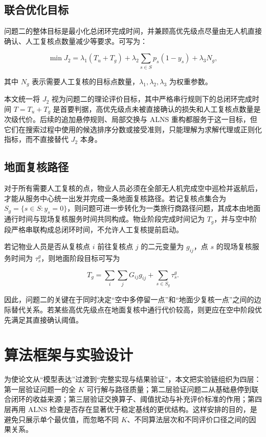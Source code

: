 \documentclass[12pt]{article}
\begin{document}
\subsection{联合优化目标}
问题二的整体目标是最小化总闭环完成时间，并兼顾高优先级点尽量由无人机直接确认、人工复核点数量减少等要求。可写为：

\begin{equation}
\min J_2 = \lambda_1 (T_u + T_g) + \lambda_2 \sum_{s \in S} p_s (1-y_s) + \lambda_3 N_g,
\end{equation}

其中 $N_g$ 表示需要人工复核的目标点数量，$\lambda_1,\lambda_2,\lambda_3$ 为权重参数。

本文统一将 $J_2$ 视为问题二的理论评价目标，其中严格串行规则下的总闭环完成时间 $T=T_u+T_g$ 是首要判据，高优先级点未被直接确认的损失和人工复核点数量是次级代价。后续的追加悬停规则、局部交换与 ALNS 重构都服务于这一目标，但它们在搜索过程中使用的候选排序分数或接受准则，只能理解为求解代理或正则化指标，而不直接替代 $J_2$ 本身。

\subsection{地面复核路径}
对于所有需要人工复核的点，物业人员必须在全部无人机完成空中巡检并返航后，才能从服务中心统一出发并完成一条地面复核路径。若记复核点集合为 $S_g=\{s \in S : y_s=0\}$，则问题可进一步转化为一类旅行商路径问题，其成本由地面通行时间与现场复核服务时间共同构成。物业阶段完成时间记为 $T_g$，并与空中阶段严格串联构成总闭环时间，不允许人工复核提前启动。

若记物业人员是否从复核点 $i$ 前往复核点 $j$ 的二元变量为 $g_{ij}$，点 $s$ 的现场复核服务时间为 $\tau_s^g$，则地面阶段目标可写为

\begin{equation}
T_g = \sum_{i}\sum_{j} G_{ij} g_{ij} + \sum_{s \in S_g} \tau_s^g.
\end{equation}

因此，问题二的关键在于同时决定“空中多停留一点”和“地面少复核一点”之间的边际替代关系。若某些高优先级点在地面复核中通行代价较高，则更应在空中阶段优先满足其直接确认阈值。

\section{算法框架与实验设计}
为使论文从“模型表达”过渡到“完整实现与结果验证”，本文把实验链组织为四层：第一层验证问题一的全 $K$ 可行解与路径质量；第二层验证问题二从基础悬停到联合闭环的收益来源；第三层验证交换算子、阈值扰动与补充评价标准的作用；第四层再用 ALNS 检查是否存在显著优于稳定基线的更优结构。这样安排的目的，是避免只展示单个最优值，而忽略不同 $K$、不同算法层次和不同评价口径之间的因果关系。
\end{document}
